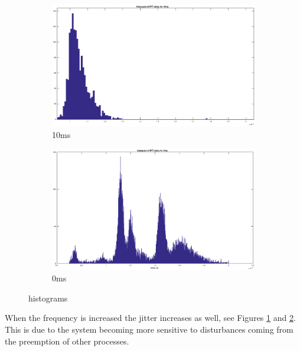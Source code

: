 \documentclass[conference]{IEEEtran}
\begin{document}
\begin{figure}
  \centering
  \begin{subfigure}{.45\linewidth}
    \centering
    \vspace{24pt}
    \includegraphics[width=\linewidth]{10ms}
    \caption{10ms}
    \label{fig:10ms}
  \end{subfigure}
  \begin{subfigure}{.45\linewidth}
    \centering
    \vspace{24pt}
    \includegraphics[width=\linewidth]{0ms}
    \caption{0ms}
    \label{fig:0ms}
  \end{subfigure}
\caption{histograms}
\label{fig:histograms}
\end{figure}

When the frequency is increased the jitter increases as well, see Figures \ref{fig:10ms} and \ref{fig:0ms}. This is due to the system becoming more sensitive to disturbances coming from the preemption of other processes.
\end{document}
